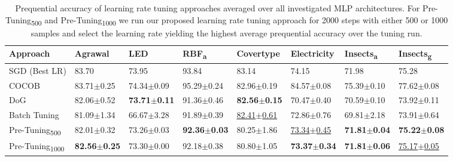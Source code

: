 \documentclass{article} %
\begin{document}
\begin{table}[!ht]
   \centering
   \small
   \caption{
      Prequential accuracy of learning rate tuning approaches averaged over all investigated MLP architectures. For Pre-Tuning\textsubscript{500} and Pre-Tuning\textsubscript{1000} we run our proposed learning rate tuning approach for 2000 steps with either 500 or 1000 samples and select the learning rate yielding the highest average prequential accuracy over the tuning run.
   }\label{tab:lr_tuning}
   \begin{tabular}{llllllll}
      \toprule
      Approach                       & Agrawal                  & LED                      & RBF\textsubscript{a}     & Covertype                  & Electricity                & Insects\textsubscript{a} & Insects\textsubscript{g}   \\
      \midrule
      SGD (Best LR)                  & 83.70                    & 73.95                    & 93.84                    & 83.14                      & 74.15                      & 71.98                    & 75.28                      \\
      COCOB                          & 83.71$\pm$0.25           & 74.34$\pm$0.09           & 95.29$\pm$0.24           & 82.96$\pm$0.19             & 84.57$\pm$0.08             & 75.39$\pm$0.10           & 77.62$\pm$0.08             \\ \midrule
      DoG                            & 82.06$\pm$0.52           & \bfseries 73.71$\pm$0.11 & 91.36$\pm$0.46           & \bfseries 82.56$\pm$0.15   & 70.47$\pm$0.40             & 70.59$\pm$0.10           & 73.92$\pm$0.11             \\
      Batch Tuning                   & 81.09$\pm$1.34           & 66.67$\pm$3.28           & 91.89$\pm$0.39           & \underline{82.41$\pm$0.61} & 72.86$\pm$0.76             & 69.81$\pm$2.18           & 73.91$\pm$0.64             \\
      Pre-Tuning\textsubscript{500}  & 82.01$\pm$0.32           & 73.26$\pm$0.03           & \bfseries 92.36$\pm$0.03 & 80.25$\pm$1.86             & \underline{73.34$\pm$0.45} & \bfseries 71.81$\pm$0.04 & \bfseries 75.22$\pm$0.08   \\
      Pre-Tuning\textsubscript{1000} & \bfseries 82.56$\pm$0.25 & 73.30$\pm$0.00           & 92.18$\pm$0.38           & 80.80$\pm$1.05             & \bfseries 73.37$\pm$0.34   & \bfseries 71.81$\pm$0.06 & \underline{75.17$\pm$0.05} \\
      \bottomrule
   \end{tabular}
\end{table}
\end{document}
